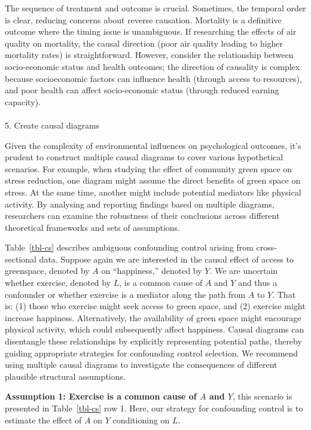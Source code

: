 \documentclass[
  single column]{article}
\makeatletter
\let\oldparagraph\paragraph
\renewcommand{\paragraph}{
    \@ifstar
      \xxxParagraphStar
      \xxxParagraphNoStar
  }
\newcommand{\xxxParagraphStar}[1]{\oldparagraph*{#1}\mbox{}}
\newcommand{\xxxParagraphNoStar}[1]{\oldparagraph{#1}\mbox{}}
\makeatother
\begin{document}
The sequence of treatment and outcome is crucial. Sometimes, the
temporal order is clear, reducing concerns about reverse causation.
Mortality is a definitive outcome where the timing issue is unambiguous.
If researching the effects of air quality on mortality, the causal
direction (poor air quality leading to higher mortality rates) is
straightforward. However, consider the relationship between
socio-economic status and health outcomes; the direction of causality is
complex because socioeconomic factors can influence health (through
access to resources), and poor health can affect socio-economic status
(through reduced earning capacity).

\paragraph{5. Create causal diagrams}\label{create-causal-diagrams}

Given the complexity of environmental influences on psychological
outcomes, it's prudent to construct multiple causal diagrams to cover
various hypothetical scenarios. For example, when studying the effect of
community green space on stress reduction, one diagram might assume the
direct benefits of green space on stress. At the same time, another
might include potential mediators like physical activity. By analysing
and reporting findings based on multiple diagrams, researchers can
examine the robustness of their conclusions across different theoretical
frameworks and sets of assumptions.

Table~\ref{tbl-cs} describes ambiguous confounding control arising from
cross-sectional data. Suppose again we are interested in the causal
effect of access to greenspace, denoted by \(A\) on ``happiness,''
denoted by \(Y\). We are uncertain whether exercise, denoted by \(L\),
is a common cause of \(A\) and \(Y\) and thus a confounder or whether
exercise is a mediator along the path from \(A\) to \(Y\). That is: (1)
those who exercise might seek access to green space, and (2) exercise
might increase happiness. Alternatively, the availability of green space
might encourage physical activity, which could subsequently affect
happiness. Causal diagrams can disentangle these relationships by
explicitly representing potential paths, thereby guiding appropriate
strategies for confounding control selection. We recommend using
multiple causal diagrams to investigate the consequences of different
plausible structural assumptions.

\textbf{Assumption 1: Exercise is a common cause of \(A\) and \(Y\)},
this scenario is presented in Table~\ref{tbl-cs} row 1. Here, our
strategy for confounding control is to estimate the effect of \(A\) on
\(Y\) conditioning on \(L\).
\end{document}
